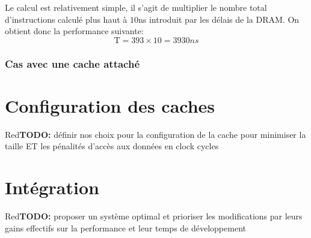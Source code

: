 \documentclass[a11paper]{article}
\newcommand{\todo}[1]{\begin{color}{Red}\textbf{TODO:} #1\end{color}}
\begin{document}
Le calcul est relativement simple, il s'agit de multiplier le nombre total d'instructions calculé plus haut à $10$ns introduit par les délais de la DRAM.
On obtient donc la performance suivante:
$$
\text{T}=393\times10=3930ns
$$

\subsubsection{Cas avec une cache attaché}



\section{Configuration des caches}

\todo{définir nos choix pour la configuration de la cache pour minimiser la
taille ET les pénalités d'accès aux données en clock cycles}

\section{Intégration}

\todo{proposer un système optimal et prioriser les modifications par leurs
gains effectifs sur la performance et leur temps de développement}
\end{document}
